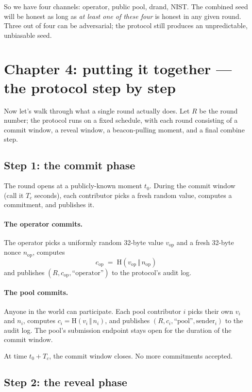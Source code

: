 \documentclass[11pt]{article}
\newcommand{\Hash}{\mathrm{H}}
\begin{document}
So we have four channels: operator, public pool, drand, NIST. The combined seed will be honest as long as \emph{at least one of these four} is honest in any given round. Three out of four can be adversarial; the protocol still produces an unpredictable, unbiasable seed.

\section{Chapter 4: putting it together --- the protocol step by step}

Now let's walk through what a single round actually does. Let $R$ be the round number; the protocol runs on a fixed schedule, with each round consisting of a commit window, a reveal window, a beacon-pulling moment, and a final combine step.

\subsection*{Step 1: the commit phase}

The round opens at a publicly-known moment $t_0$. During the commit window (call it $T_c$ seconds), each contributor picks a fresh random value, computes a commitment, and publishes it.

\paragraph{The operator commits.} The operator picks a uniformly random 32-byte value $v_{\text{op}}$ and a fresh 32-byte nonce $n_{\text{op}}$, computes
\[
c_{\text{op}} \;=\; \Hash(v_{\text{op}} \,\Vert\, n_{\text{op}})
\]
and publishes $(R, c_{\text{op}}, \text{``operator''})$ to the protocol's audit log.

\paragraph{The pool commits.} Anyone in the world can participate. Each pool contributor $i$ picks their own $v_i$ and $n_i$, computes $c_i = \Hash(v_i \,\Vert\, n_i)$, and publishes $(R, c_i, \text{``pool''}, \text{sender}_i)$ to the audit log. The pool's submission endpoint stays open for the duration of the commit window.

At time $t_0 + T_c$, the commit window closes. No more commitments accepted.

\subsection*{Step 2: the reveal phase}
\end{document}
